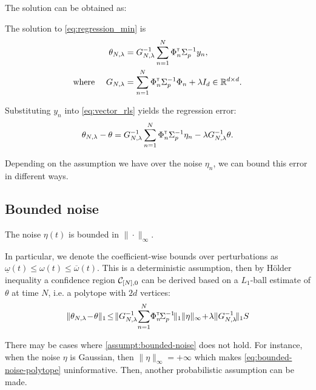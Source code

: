 \documentclass{article}
\begin{document}
The solution can be obtained as:

\begin{proposition}
\label{prop:regularized_solution}
The solution to \eqref{eq:regression_min} is
\begin{align}
    \label{eq:vector_rls}
    \theta_{N,\lambda} &= G_{N, \lambda}^{-1} \sum_{n=1}^N \Phi_n^{\mathsf{\scriptscriptstyle T}} \Sigma_p^{-1} y_n,\\
	\label{eq:g_n_lambda}
    \text{where }\quad G_{N, \lambda} &= \sum_{n=1}^N \Phi_{n}^{\mathsf{\scriptscriptstyle T}}\Sigma_p^{-1}\Phi_{n}  + \lambda I_d \in \mathbb{R}^{d\times d}.
\end{align}
\end{proposition}

Substituting $y_n$ into \eqref{eq:vector_rls} yields the regression error:
\begin{align}
    \theta_{N,\lambda} - \theta = G_{N, \lambda}^{-1}\sum_{n=1}^N \Phi_n^{\mathsf{\scriptscriptstyle T}} \Sigma_p^{-1}\eta_n - \lambda G_{N, \lambda}^{-1}\theta.
\end{align}


Depending on the assumption we have over the noise $\eta_n$, we can bound this error in different ways.


\subsection{Bounded noise}

\begin{assumption}
\label{assumpt:bounded-noise}
The noise $\eta(t)$ is bounded in $\|\cdot\|_\infty$.
\end{assumption}

In particular, we denote the coefficient-wise bounds over perturbations as $\underline{\omega}(t) \leq \omega(t) \leq \overline{\omega}(t)$. This is a deterministic assumption, then by Hölder inequality a confidence region $\mathcal{C}_{[N],0}$ can be derived based on a $L_1$-ball estimate of $\theta$ at time $N$, i.e. a polytope with $2d$ vertices:
\begin{equation}
\label{eq:bounded-noise-polytope}
\|\theta_{N,\lambda}\! -\! \theta\|_1\! \leq \! \|G_{N, \lambda}^{-1}\!\sum_{n=1}^N \!\Phi_n^\transp\! \Sigma_p^{-1}\!\|_1\|\eta\|_\infty\! +\!\lambda\|G_{N, \lambda}^{-1}\!\|_1S
\end{equation}

There may be cases where \autoref{assumpt:bounded-noise} does not hold. For instance, when the noise $\eta$ is Gaussian, then $\|\eta\|_\infty=+\infty$ which makes \eqref{eq:bounded-noise-polytope} uninformative. Then, another probabilistic assumption can be made.
\end{document}
